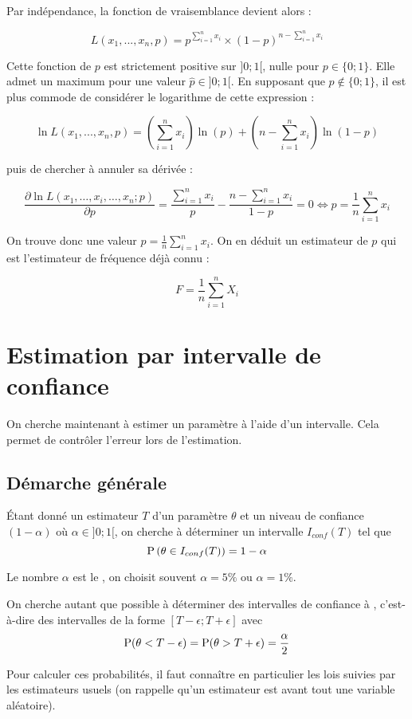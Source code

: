 Par indépendance, la fonction de vraisemblance devient alors :

$$L(x_1,...,x_n, p) = p^{\sum_{i=1}^n x_i} \times \left(1-p\right)^{n-\sum_{i=1}^n x_i}$$

Cette fonction de $p$ est strictement positive sur $]0;1[$, nulle pour $p \in \{0;1\}$. Elle admet un maximum pour une valeur $\hat{p} \in ]0;1[$. En supposant que $p \notin \{0;1\}$, il est plus commode de considérer le logarithme de cette expression :

$$\ln L(x_1,...,x_n, p) = \left(\sum_{i=1}^n x_i \right) \ln(p) + \left(n-\sum_{i=1}^n x_i \right) \ln(1-p)$$

puis de chercher à annuler sa dérivée :

$$\frac {\partial \ln L(x_{1},\ldots ,x_{i},\ldots ,x_{n};p )}{\partial p } = \frac{\sum_{i=1}^n x_i}{p} - \frac{n - \sum_{i=1}^n x_i}{1-p} = 0 \iff p = \frac{1}{n } \sum_{i=1}^n x_i$$

On trouve donc une valeur $\hat{p} = \frac{1}{n } \sum_{i=1}^n x_i$. On en déduit un estimateur de $p$ qui est l'estimateur de fréquence déjà connu :

$$F = \frac{1}{n } \sum_{i=1}^n X_i$$


\section{Estimation par intervalle de confiance}
On cherche maintenant à estimer un paramètre à l'aide d'un intervalle. Cela  permet de contrôler l'erreur lors de l'estimation.

\subsection{Démarche générale}
\'Etant donné un estimateur $T$ d'un paramètre $\theta$ et un niveau de confiance $(1-\alpha)$ où $\alpha \in ]0;1[$, on cherche à déterminer un intervalle $I_{conf}(T)$ tel que 
$$\operatorname{P}\left(\theta \in I_{conf}(T)\right) = 1-\alpha$$

Le nombre $\alpha$ est le , on choisit souvent $\alpha = 5\%$ ou $\alpha = 1\%$.

On cherche autant que possible à déterminer des intervalles de confiance à , c'est-à-dire des intervalles de la forme $[T-\epsilon;T+\epsilon]$ avec 
$$\operatorname{P}(\theta < T-\epsilon) = \operatorname{P}(\theta > T+\epsilon) = \frac{\alpha}{2}$$

Pour calculer ces probabilités, il faut connaître en particulier les lois suivies par les estimateurs usuels (on rappelle qu'un estimateur est avant tout une variable aléatoire).


